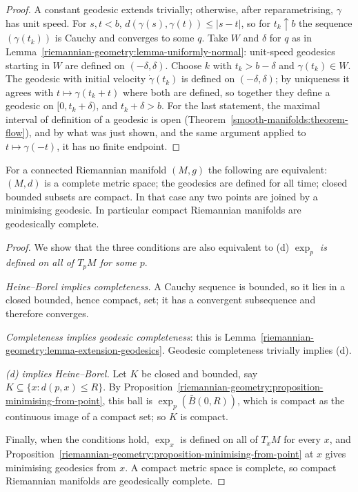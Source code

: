 \begin{proof}
A constant geodesic extends trivially; otherwise, after reparametrising, $\gamma$ has unit speed. For $s, t < b$, $d(\gamma(s), \gamma(t)) \leq |s - t|$, so for $t_k \uparrow b$ the sequence $(\gamma(t_k))$ is Cauchy and converges to
some $q$. Take $W$ and $\delta$ for $q$ as in Lemma~\ref{riemannian-geometry:lemma-uniformly-normal}: unit-speed geodesics starting in $W$ are defined on $(-\delta, \delta)$. Choose $k$ with $t_k > b - \delta$ and
$\gamma(t_k) \in W$. The geodesic with initial velocity $\dot\gamma(t_k)$ is defined on $(-\delta, \delta)$; by uniqueness it agrees with $t \mapsto \gamma(t_k + t)$ where both are defined, so together they define a geodesic on
$[0, t_k + \delta)$, and $t_k + \delta > b$. For the last statement, the maximal interval of definition of a geodesic is open (Theorem~\ref{smooth-manifolds:theorem-flow}), and by what was just shown, and the same argument applied to $t \mapsto \gamma(-t)$, it has no finite endpoint.
\end{proof}

\begin{theorem}\label{riemannian-geometry:theorem-hopf-rinow}
For a connected Riemannian manifold $(M, g)$ the following are equivalent: $(M, d)$ is a complete metric space; the geodesics are defined for all time; closed bounded subsets are compact. In that case any
two points are joined by a minimising geodesic. In particular compact Riemannian manifolds are geodesically complete.
\end{theorem}

\begin{proof}
We show that the three conditions are also equivalent to (d) \emph{$\exp_p$ is defined on all of $T_pM$ for some $p$}.

\emph{Heine--Borel implies completeness.} A Cauchy sequence is bounded, so it lies in a closed bounded, hence compact, set; it has a convergent subsequence and therefore converges.

\emph{Completeness implies geodesic completeness}: this is Lemma~\ref{riemannian-geometry:lemma-extension-geodesics}. Geodesic completeness trivially implies (d).

\emph{(d) implies Heine--Borel.} Let $K$ be closed and bounded, say $K \subseteq \{x : d(p, x) \leq R\}$. By Proposition~\ref{riemannian-geometry:proposition-minimising-from-point}, this ball is $\exp_p(\bar B(0, R))$, which is compact
as the continuous image of a compact set; so $K$ is compact.

Finally, when the conditions hold, $\exp_x$ is defined on all of $T_xM$ for every $x$, and Proposition~\ref{riemannian-geometry:proposition-minimising-from-point} at $x$ gives minimising geodesics from $x$. A compact metric space is
complete, so compact Riemannian manifolds are geodesically complete.
\end{proof}


